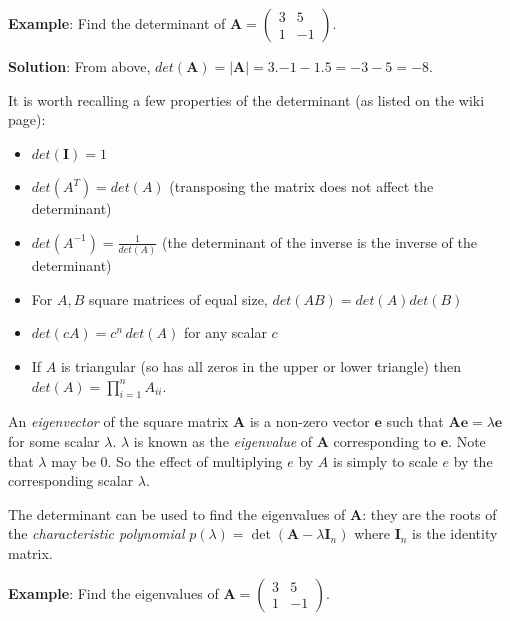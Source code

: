 {\bf Example}: Find the determinant of $\mathbf  A = \left(\begin{array}{ll}3 & 5\\1&-1\end{array}\right) $.

{\bf Solution}: From above, $det(\mathbf A) = |\mathbf A| = 3 . {-1}  - 1.5 = {-3} -5 = -8$. \sqend

It is worth recalling a few properties of the determinant (as listed on the wiki page): 
\begin{itemize}
\item $det(\mathbf I) = 1$ 
\item $det(A^T) = det(A)$ (transposing the matrix does not affect the determinant) 
\item $det(A^{-1}) = \frac{1}{det(A)}$ (the determinant of the inverse is the inverse of the determinant)
\item For $A, B$ square matrices of equal size, $det(AB) = det(A)det(B)$
\item $det(cA) = c^n\, det(A)$ for any scalar $c$
\item If $A$ is triangular (so has all zeros in the upper or lower triangle) then $det(A) = \prod_{i = 1}^n A_{ii}$.
\end{itemize}


An {\em eigenvector} of the square matrix $\mathbf A$ is a non-zero vector $\mathbf e$ such that $\mathbf A \mathbf e = \lambda \mathbf e$ for some scalar $\lambda$.  $\lambda$ is known as the {\em eigenvalue} of  $\mathbf A$  corresponding to $\mathbf e$.  Note that $\lambda$ may be 0.   So the effect of multiplying $e$ by $A$ is simply to scale $e$ by the corresponding scalar $\lambda$.  

The determinant can be used to find the eigenvalues of $\mathbf A$:   they are the roots of
the {\em characteristic polynomial} $p(\lambda) = \det(\mathbf{A }- \lambda\mathbf{I}_n)$
where $\mathbf{I}_n$ is the identity matrix.


{\bf Example}: Find the eigenvalues of $\mathbf  A = \left(\begin{array}{ll}3 & 5\\1&-1\end{array}\right) $.


